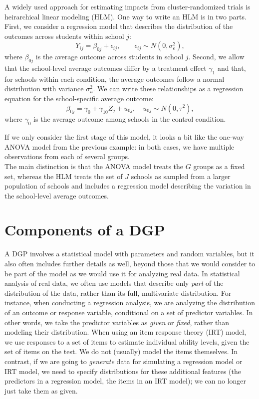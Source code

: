 \documentclass[
]{book}
\begin{document}
A widely used approach for estimating impacts from cluster-randomized trials is heirarchical linear modeling (HLM).
One way to write an HLM is in two parts.
First, we consider a regression model that describes the distribution of the outcomes across students within school \(j\):
\[
Y_{ij} = \beta_{0j} + \epsilon_{ij}, \qquad \epsilon_{ij} \sim N(0, \sigma_{\epsilon}^2),
\]
where \(\beta_{0j}\) is the average outcome across students in school \(j\).
Second, we allow that the school-level average outcomes differ by a treatment effect \(\gamma_{1}\) and that, for schools within each condition, the average outcomes follow a normal distribution with variance \(\sigma_u^2\).
We can write these relationships as a regression equation for the school-specific average outcome:
\[
\beta_{0j} = \gamma_{0} + \gamma_{10} Z_j + u_{0j}, \quad u_{0j} \sim N(0, \tau^2),
\]
where \(\gamma_{0}\) is the average outcome among schools in the control condition.

If we only consider the first stage of this model, it looks a bit like the one-way ANOVA model from the previous example:
in both cases, we have multiple observations from each of several groups.\\
The main distinction is that the ANOVA model treats the \(G\) groups as a fixed set, whereas the HLM treats the set of \(J\) schools as sampled from a larger population of schools and includes a regression model describing the variation in the school-level average outcomes.

\section{Components of a DGP}\label{components-of-a-dgp}

A DGP involves a statistical model with parameters and random variables, but it also often includes further details as well, beyond those that we would consider to be part of the model as we would use it for analyzing real data.
In statistical analysis of real data, we often use models that describe only \emph{part} of the distribution of the data, rather than its full, multivariate distribution.
For instance, when conducting a regression analysis, we are analyzing the distribution of an outcome or response variable, conditional on a set of predictor variables.
In other words, we take the predictor variables as \emph{given} or \emph{fixed}, rather than modeling their distribution.
When using an item response theory (IRT) model, we use responses to a set of items to estimate individual ability levels, given the set of items on the test.
We do not (usually) model the items themselves.
In contrast, if we are going to \emph{generate} data for simulating a regression model or IRT model, we need to specify distributions for these additional features (the predictors in a regression model, the items in an IRT model); we can no longer just take them as given.
\end{document}

